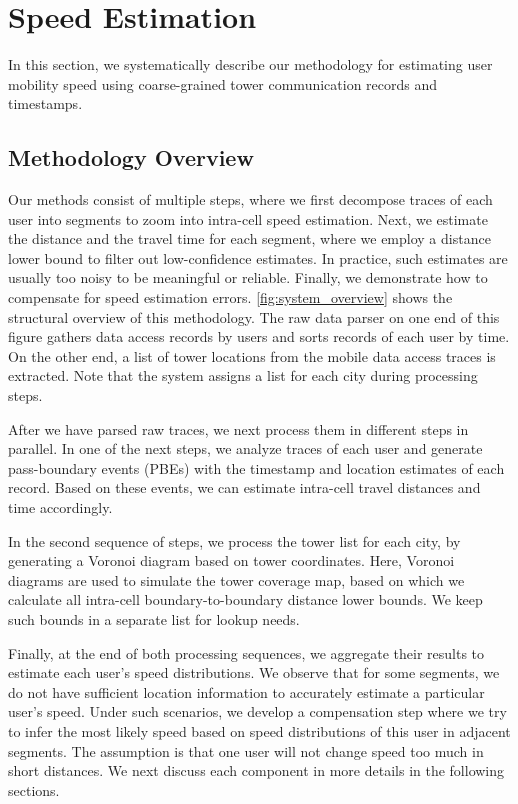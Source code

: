 \section{Speed Estimation}\label{approach}

In this section, we systematically describe our methodology for estimating user mobility speed using coarse-grained tower communication records and timestamps.

\subsection{Methodology Overview}

Our methods consist of multiple steps, where we first decompose traces of each user into segments to zoom into intra-cell speed estimation. Next, we estimate the distance and the travel time for each segment, where we employ a distance lower bound to filter out low-confidence estimates. In practice, such estimates are usually too noisy to be meaningful or reliable. Finally, we demonstrate how to compensate for speed estimation errors. \autoref{fig:system_overview} shows the structural overview of this methodology. The raw data parser on one end of this figure gathers data access records by users and sorts records of each user by time. On the other end, a list of tower locations from the mobile data access traces is extracted. Note that the system assigns a list for each city during processing steps.

After we have parsed raw traces, we next process them in different steps in parallel. In one of the next steps, we analyze traces of each user and generate pass-boundary events (PBEs) with the timestamp and location estimates of each record. Based on these events, we can estimate intra-cell travel distances and time accordingly.

In the second sequence of steps, we process the tower list for each city, by generating a Voronoi diagram based on tower coordinates. Here, Voronoi diagrams are used to simulate the tower coverage map, based on which we calculate all intra-cell boundary-to-boundary distance lower bounds. We keep such bounds in a separate list for lookup needs.

Finally, at the end of both processing sequences, we aggregate their results to estimate each user's speed distributions. We observe that for some segments, we do not have sufficient location information to accurately estimate a particular user's speed. Under such scenarios, we develop a compensation step where we try to infer the most likely speed based on speed distributions of this user in adjacent segments. The assumption is that one user will not change speed too much in short distances. We next discuss each component in more details in the following sections.

